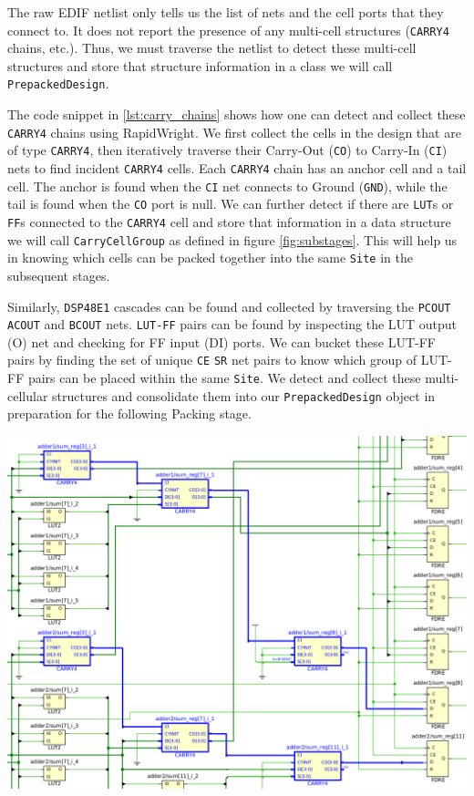 \begin{multicols}{2}
The raw EDIF netlist only tells us the list of nets and the cell ports that they connect to. 
It does not report the presence of any multi-cell structures (\texttt{CARRY4} chains, etc.). 
Thus, we must traverse the netlist to detect these multi-cell structures and store that structure information in a class we will call \texttt{PrepackedDesign}.

The code snippet in \ref{lst:carry_chains} shows how one can detect and collect these \texttt{CARRY4} chains using RapidWright. 
We first collect the cells in the design that are of type \texttt{CARRY4}, then iteratively traverse their Carry-Out (\texttt{CO}) to Carry-In (\texttt{CI}) nets to find incident \texttt{CARRY4} cells.
Each \texttt{CARRY4} chain has an anchor cell and a tail cell.
The anchor is found when the \texttt{CI} net connects to Ground (\texttt{GND}), while the tail is found when the \texttt{CO} port is null. 
We can further detect if there are \texttt{LUT}s or \texttt{FF}s connected to the \texttt{CARRY4} cell and store that information in a data structure we will call \texttt{CarryCellGroup} as defined in figure \ref{fig:substages}.
This will help us in knowing which cells can be packed together into the same \texttt{Site} in the subsequent stages. 

Similarly, \texttt{DSP48E1} cascades can be found and collected by traversing the \texttt{PCOUT} \texttt{ACOUT} and \texttt{BCOUT} nets.
\texttt{LUT-FF} pairs can be found by inspecting the LUT output (O) net and checking for FF input (DI) ports. 
We can bucket these LUT-FF pairs by finding the set of unique \texttt{CE} \texttt{SR} net pairs to know which group of LUT-FF pairs can be placed within the same \texttt{Site}. 
We detect and collect these multi-cellular structures and consolidate them into our \texttt{PrepackedDesign} object in preparation for the following Packing stage. 


\end{multicols}
{
    \centering
    \includegraphics[width=0.8\columnwidth]{figures/carry_chain_traversal.png}
    \label{fig:carry_chain_traversal}
}
